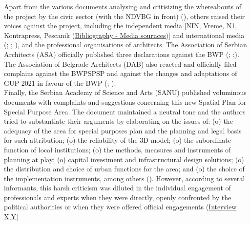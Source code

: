 \documentclass[11pt]{report}
\begin{document}
{{{{Apart from the various documents analysing and critisizing the whereabouts of the project by the civic sector (with the NDVBG in front) (\href{NBG}{\citealt{inicijativa_ne_davimo_beograd_analiza_2016}}), others raised their voices against the project, including the independent media [NIN, Vreme, N1, Kontrapress, Pescanik (\href{Bibliography - Media sournces}{Bibliography - Media sournces})] and international media (\href{Wright}{\citealt{wright_belgrade_2015}}; \href{Eror}{\citealt{eror_belgrades_2015}}; \href{BBC}{\citealt{ahmed_controversy_2016}}), and the professional organisations of architects.
The Association of Serbian Architects (ASA) officially published three declarations against the BWP (\href{Deklaracija1}{\citealt{akademija_arhitekture_srbije_deklaracija_2016}}; \href{Deklaracija2}{\citealt{akademija_arhitekture_srbije_deklaracija_2016-1}};\href{Deklaracija3}{\citealt{akademija_arhitekture_srbije_deklaracija_2015}}). 
The Association of Belgrade Architects (DAB) also reacted and officially filed complains against the BWPSPSP and against the changes and adaptations of GUP 2021 in favour of the BWP (\href{UAS}{\citealt{udruzenje_arhitekata_srbije_odgovor_2014}}; \href{Primedbe}{\citealt{drustvo_arhitekata_srbije_primedbe_2014}}).
\\

Finally, the Serbian Academy of Science and Arts (SANU) published voluminous documents with complaints and suggestions concerning this new Spatial Plan for Special Purpose Area. The document maintained a neutral tone and the authors tried to substantiate their arguments by elaborating on the issues of: (o) the adequacy of the area for special purposes plan and the planning and legal basis for such attribution; (o) the reliability of the 3D model; (o) the subordinate function of local institutions; (o) the methods, measures and instruments of planning at play; (o) capital investment and infrastructural design solutions; (o) the distribution and choice of urban functions for the area; and (o) the choice of the implementation instruments, among others (\href{ref}{\citealt{sanu_nacrt_2014}}).
However, according to several informants, this harsh criticism was diluted in the individual engagement of professionals and experts when they were directly, openly confronted by the political authorities or when they were offered official engagements
(\href{InterviewX}{Interview X,Y})
\\

}}}}
\end{document}
